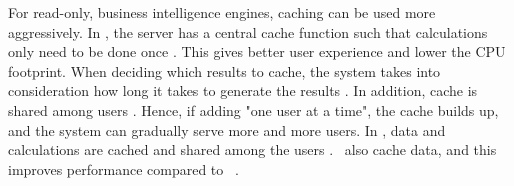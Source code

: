 For read-only, business intelligence engines, caching can be used more aggressively. In \qlikview, the server has a central cache function such that calculations only need to be done once \cite{Qlik2011-ef}. This gives better user experience and lower the CPU footprint. When deciding which results to cache, the system takes into consideration how long it takes to generate the results \cite{noauthor_undateds-js}. In addition, cache is shared among users \cite{Qlik2011-yc}. Hence, if adding "one user at a time", the cache builds up, and the system can gradually serve more and more users. In \tableau, data and calculations are cached and shared among the users \cite{Kamkolkar2015-iq}. \vertipaq~also cache data, and this improves performance compared to \mssql~\cite{Ferrari2012-hm}.
